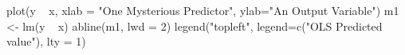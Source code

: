 \begin{Schunk}
\begin{Sinput}
 plot(y ~ x, xlab = "One Mysterious Predictor", ylab="An Output Variable")
 m1 <- lm(y ~ x)
 abline(m1, lwd = 2)
 legend("topleft", legend=c("OLS Predicted value"), lty = 1)
\end{Sinput}
\end{Schunk}
